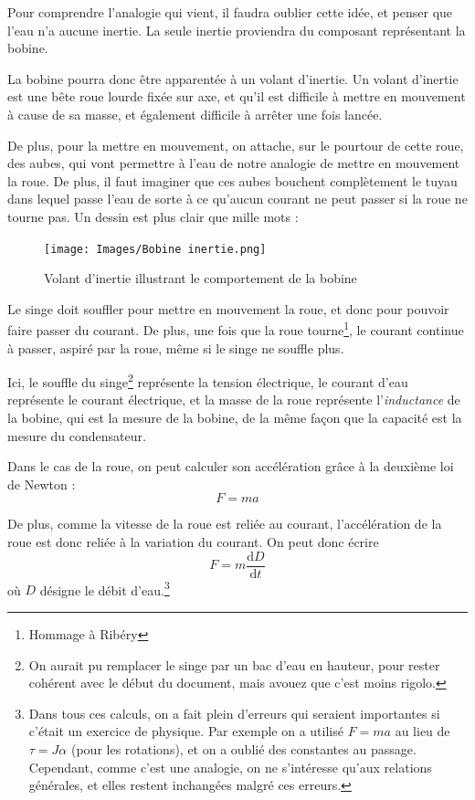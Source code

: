 \documentclass{article}
\begin{document}
Pour comprendre l'analogie qui vient, il faudra oublier cette idée, et penser que l'eau n'a aucune inertie. La seule inertie proviendra du composant représentant la bobine.

La bobine pourra donc être apparentée à un volant d'inertie. Un volant d'inertie est une bête roue lourde fixée sur axe, et qu'il est difficile à mettre en mouvement à cause de sa masse, et également difficile à arrêter une fois lancée.

De plus, pour la mettre en mouvement, on attache, sur le pourtour de cette roue, des aubes, qui vont permettre à l'eau de notre analogie de mettre en mouvement la roue. De plus, il faut imaginer que ces aubes bouchent complètement le tuyau dans lequel passe l'eau de sorte à ce qu'aucun courant ne peut passer si la roue ne tourne pas.
\newpage
\noindent Un dessin est plus clair que mille mots :
\begin{figure}[h]
    \centering
    \texttt{[image: Images/Bobine inertie.png]}
    \caption{Volant d'inertie illustrant le comportement de la bobine}
\end{figure}

Le singe doit souffler pour mettre en mouvement la roue, et donc pour pouvoir faire passer du courant. De plus, une fois que la roue tourne\footnote{Hommage à Ribéry}, le courant continue à passer, aspiré par la roue, même si le singe ne souffle plus.

Ici, le souffle du singe\footnote{On aurait pu remplacer le singe par un bac d'eau en hauteur, pour rester cohérent avec le début du document, mais avouez que c'est moins rigolo.} représente la tension électrique, le courant d'eau représente le courant électrique, et la masse de la roue représente l'\emph{inductance} de la bobine, qui est la mesure de la bobine, de la même façon que la capacité est la mesure du condensateur.

\noindent Dans le cas de la roue, on peut calculer son accélération grâce à la deuxième loi de Newton :
\[
F=ma
\]

De plus, comme la vitesse de la roue est reliée au courant, l'accélération de la roue est donc reliée à la variation du courant. On peut donc écrire
\[
F = m\frac{\mathrm{d}D}{\mathrm{d}t}
\]
où $D$ désigne le débit d'eau.\footnote{Dans tous ces calculs, on a fait plein d'erreurs qui seraient importantes si c'était un exercice de physique. Par exemple on a utilisé $F=ma$ au lieu de $\tau = J \alpha$ (pour les rotations), et on a oublié des constantes au passage. Cependant, comme c'est une analogie, on ne s'intéresse qu'aux relations générales, et elles restent inchangées malgré ces erreurs.}
\end{document}
